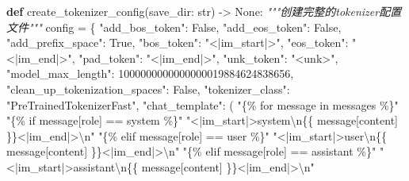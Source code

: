 \documentclass[
]{article}
\newenvironment{Shaded}{}{}
\newcommand{\BuiltInTok}[1]{\textcolor[rgb]{0.00,0.50,0.00}{#1}}
\newcommand{\CharTok}[1]{\textcolor[rgb]{0.25,0.44,0.63}{#1}}
\newcommand{\CommentTok}[1]{\textcolor[rgb]{0.38,0.63,0.69}{\textit{#1}}}
\newcommand{\DecValTok}[1]{\textcolor[rgb]{0.25,0.63,0.44}{#1}}
\newcommand{\KeywordTok}[1]{\textcolor[rgb]{0.00,0.44,0.13}{\textbf{#1}}}
\newcommand{\NormalTok}[1]{#1}
\newcommand{\OperatorTok}[1]{\textcolor[rgb]{0.40,0.40,0.40}{#1}}
\newcommand{\SpecialCharTok}[1]{\textcolor[rgb]{0.25,0.44,0.63}{#1}}
\newcommand{\StringTok}[1]{\textcolor[rgb]{0.25,0.44,0.63}{#1}}
\newcommand{\VariableTok}[1]{\textcolor[rgb]{0.10,0.09,0.49}{#1}}
\begin{document}
\begin{Shaded}
\begin{Highlighting}[]
\KeywordTok{def}\NormalTok{ create\_tokenizer\_config(save\_dir: }\BuiltInTok{str}\NormalTok{) }\OperatorTok{{-}\textgreater{}} \VariableTok{None}\NormalTok{:}
    \CommentTok{"""创建完整的tokenizer配置文件"""}
\NormalTok{    config }\OperatorTok{=}\NormalTok{ \{}
        \StringTok{"add\_bos\_token"}\NormalTok{: }\VariableTok{False}\NormalTok{,}
        \StringTok{"add\_eos\_token"}\NormalTok{: }\VariableTok{False}\NormalTok{,}
        \StringTok{"add\_prefix\_space"}\NormalTok{: }\VariableTok{True}\NormalTok{,}
        \StringTok{"bos\_token"}\NormalTok{: }\StringTok{"\textless{}|im\_start|\textgreater{}"}\NormalTok{,}
        \StringTok{"eos\_token"}\NormalTok{: }\StringTok{"\textless{}|im\_end|\textgreater{}"}\NormalTok{,}
        \StringTok{"pad\_token"}\NormalTok{: }\StringTok{"\textless{}|im\_end|\textgreater{}"}\NormalTok{,}
        \StringTok{"unk\_token"}\NormalTok{: }\StringTok{"\textless{}unk\textgreater{}"}\NormalTok{,}
        \StringTok{"model\_max\_length"}\NormalTok{: }\DecValTok{1000000000000000019884624838656}\NormalTok{,}
        \StringTok{"clean\_up\_tokenization\_spaces"}\NormalTok{: }\VariableTok{False}\NormalTok{,}
        \StringTok{"tokenizer\_class"}\NormalTok{: }\StringTok{"PreTrainedTokenizerFast"}\NormalTok{,}
        \StringTok{"chat\_template"}\NormalTok{: (}
            \StringTok{"\{}\SpecialCharTok{\% f}\StringTok{or message in messages \%\}"}
            \StringTok{"\{}\SpecialCharTok{\% i}\StringTok{f message[\textquotesingle{}role\textquotesingle{}] == \textquotesingle{}system\textquotesingle{} \%\}"}
            \StringTok{"\textless{}|im\_start|\textgreater{}system}\CharTok{\textbackslash{}n}\SpecialCharTok{\{\{}\StringTok{ message[\textquotesingle{}content\textquotesingle{}] }\SpecialCharTok{\}\}}\StringTok{\textless{}|im\_end|\textgreater{}}\CharTok{\textbackslash{}n}\StringTok{"}
            \StringTok{"\{}\SpecialCharTok{\% e}\StringTok{lif message[\textquotesingle{}role\textquotesingle{}] == \textquotesingle{}user\textquotesingle{} \%\}"}
            \StringTok{"\textless{}|im\_start|\textgreater{}user}\CharTok{\textbackslash{}n}\SpecialCharTok{\{\{}\StringTok{ message[\textquotesingle{}content\textquotesingle{}] }\SpecialCharTok{\}\}}\StringTok{\textless{}|im\_end|\textgreater{}}\CharTok{\textbackslash{}n}\StringTok{"}
            \StringTok{"\{}\SpecialCharTok{\% e}\StringTok{lif message[\textquotesingle{}role\textquotesingle{}] == \textquotesingle{}assistant\textquotesingle{} \%\}"}
            \StringTok{"\textless{}|im\_start|\textgreater{}assistant}\CharTok{\textbackslash{}n}\SpecialCharTok{\{\{}\StringTok{ message[\textquotesingle{}content\textquotesingle{}] }\SpecialCharTok{\}\}}\StringTok{\textless{}|im\_end|\textgreater{}}\CharTok{\textbackslash{}n}\StringTok{"}

\end{Highlighting}
\end{Shaded}
\end{document}
